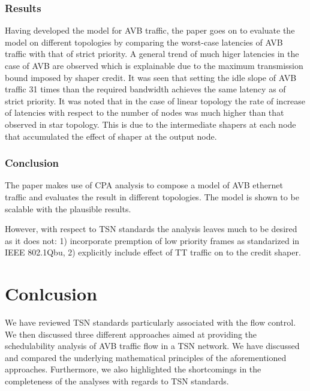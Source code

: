\documentclass[journal,12pt,twocolumn]{IEEEtran}
\begin{document}
\subsubsection {Results}
Having developed the model for AVB traffic, the paper goes on to evaluate the model on different topologies by comparing the worst-case latencies of AVB traffic with that of strict priority. A general trend of much higer latencies in the case of AVB are observed which is explainable due to the maximum transmission bound imposed by shaper credit. It was seen that setting the idle slope of AVB traffic 31 times than the required bandwidth achieves the same latency as of strict priority. It was noted that in the case of linear topology the rate of increase of latencies with respect to the number of nodes was much higher than that observed in star topology. This is due to the intermediate shapers at each node that accumulated the effect of shaper at the output node.
\subsubsection {Conclusion}
The paper makes use of CPA analysis to compose a model of AVB ethernet traffic and evaluates the result in different topologies. The model is shown to be scalable with the plausible results. 

However, with respect to TSN standards the analysis leaves much to be desired as it does not: 1) incorporate premption of low priority frames as standarized in IEEE 802.1Qbu, 2) explicitly include effect of TT traffic on to the credit shaper.

\section {Conlcusion}
We have reviewed TSN standards particularly associated with the flow control. We then discussed three different approaches aimed at  providing the schedulability analysis of AVB traffic flow in a TSN network. We have discussed and compared the underlying mathematical principles of the aforementioned approaches. Furthermore, we also highlighted the shortcomings in the completeness of the analyses with regards to TSN standards.

\end{document}
